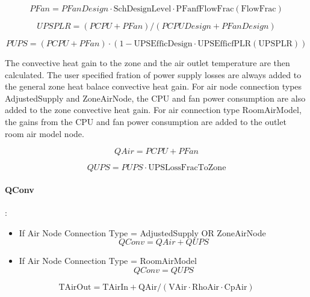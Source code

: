 \begin{equation}
PFan = PFanDesign \cdot \textrm{SchDesignLevel} \cdot \textrm{PFanfFlowFrac}(\textrm{FlowFrac})
\end{equation}

\begin{equation}
UPSPLR = (PCPU + PFan) / (PCPUDesign + PFanDesign)
\end{equation}

\begin{equation}
PUPS = (PCPU + PFan) \cdot (1 - \textrm{UPSEfficDesign} \cdot \textrm{UPSEfficfPLR} (\textrm{UPSPLR}))
\end{equation}

The convective heat gain to the zone and the air outlet temperature are then calculated. The user specified fration of power supply losses are always added to the general zone heat balace convective heat gain. For air node connection types AdjustedSupply and ZoneAirNode, the CPU and fan power consumption are also added to the zone convective heat gain. For air connection type RoomAirModel, the gains from the CPU and fan power consumption are added to the outlet room air model node.

\begin{equation}
QAir = PCPU + PFan
\end{equation}

\begin{equation}
QUPS = PUPS \cdot \textrm{UPSLossFracToZone}
\end{equation}

\paragraph{QConv}:

\begin{itemize}
    \tightlist
  \item
    If Air Node Connection Type = AdjustedSupply OR ZoneAirNode
\begin{equation}
QConv = QAir + QUPS
\end{equation}
  \item
    If Air Node Connection Type = RoomAirModel
\begin{equation}
QConv = QUPS
\end{equation}
\end{itemize}

\begin{equation}
\textrm{TAirOut} = \textrm{TAirIn} + \textrm{QAir} / (\textrm{VAir} \cdot \textrm{RhoAir} \cdot \textrm{CpAir})
\end{equation}


